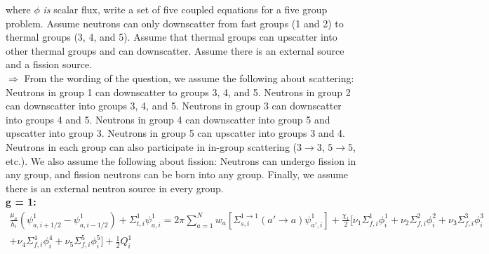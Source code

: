 \documentclass[10pt]{article}
\begin{document}
where  $\phi$ \textit{is} scalar flux, write a set of five coupled equations for a five group problem. Assume neutrons can only downscatter from fast groups (1 and 2) to thermal groups (3, 4, and 5). Assume that thermal groups can upscatter into other thermal groups and can downscatter. Assume there is an external source and a fission source.\\

$\Rightarrow$ From the wording of the question, we assume the following about scattering: Neutrons in group 1 can downscatter to groups 3, 4, and 5. Neutrons in group 2 can downscatter into groups 3, 4, and 5. Neutrons in group 3 can downscatter into groups 4 and 5. Neutrons in group 4 can downscatter into group 5 and upscatter into group 3. Neutrons in group 5 can upscatter into groups 3 and 4. Neutrons in each group can also participate in in-group scattering ($3\rightarrow3$, $5\rightarrow5$, etc.). We also assume the following about fission: Neutrons can undergo fission in any group, and fission neutrons can be born into any group. Finally, we assume there is an external neutron source in every group. \\



\textbf{g = 1:}
\begin{align*}
\frac{\mu_a}{h_i}(\psi_{a,i+1/2}^1 - \psi_{a,i-1/2}^1)+ \Sigma_{t,i}^1\psi_{a,i}^1 = 2\pi\sum_{a=1}^N w_a \left[ \Sigma_{s, i}^{1\rightarrow1}(a'\rightarrow a)\psi_{a',i}^{1} \right] + \frac{\chi_1}{2} [ \nu_{1}\Sigma_{f,i}^{1}\phi_{i}^{1} + \nu_{2}\Sigma_{f,i}^{2}\phi_{i}^{2} + \nu_{3}\Sigma_{f,i}^{3}\phi_{i}^{3} \\ + \nu_{4}\Sigma_{f,i}^{4}\phi_{i}^{4} + \nu_{5}\Sigma_{f,i}^{5}\phi_{i}^{5} ] + \frac{1}{2}Q_i^1
\end{align*}
\end{document}
